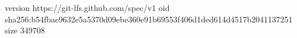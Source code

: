 version https://git-lfs.github.com/spec/v1
oid sha256:b54fbae9632e5a5370d09ebe360e91b69553f406d1ded614d4517b2041137251
size 349708
